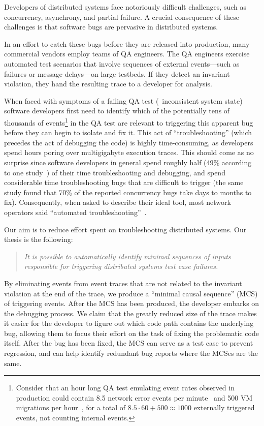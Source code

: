 Developers of distributed systems face notoriously difficult challenges, such as concurrency, asynchrony, and
partial failure. A crucial consequence of these challenges is that software
bugs are pervasive in distributed systems.

In an effort to catch these bugs
before they are released into production, many commercial vendors employ
teams of QA engineers. The QA engineers exercise automated test scenarios that involve
sequences of external events---such as failures or message delays---on large testbeds.
If they detect an invariant violation, they hand the resulting trace to a developer for analysis.

When faced with symptoms of a failing QA test (\eg~inconsistent system state)
software developers first need to identify which of the potentially tens of
thousands of events\footnote{Consider that an hour long QA test
emulating event rates observed in production could contain 8.5 network error
events per
minute~\cite{Greenberg:2009:VSF:1592568.1592576} and 500 VM migrations per
hour~\cite{Soundararajan:2010:CBS:1899928.1899941},
for a total of $8.5 \cdot 60 + 500 \approx 1000$ externally triggered events, not counting
internal events.} in the QA test are relevant to triggering
this apparent bug before they can begin to isolate and fix it.
This act of ``troubleshooting'' (which precedes the act of debugging the
code) is highly time-consuming, as developers spend hours poring
over multigigabyte execution traces. This should come as no surprise since software developers in general spend roughly half (49\% according to one
study~\cite{msoft_concurrency}) of their time troubleshooting and debugging, and spend
considerable time troubleshooting bugs that are difficult to trigger (the same study found
that 70\% of the reported concurrency bugs take days to months to fix).
Consequently, when asked to describe their
ideal tool, most network operators said ``automated
troubleshooting''~\cite{Zeng:Survey}.

Our aim is to reduce effort spent on troubleshooting distributed systems.
Our thesis is the following:
\begin{quote}
{\it
It is possible to
automatically identify minimal sequences of inputs
responsible for triggering
distributed systems test case failures.
}
\end{quote}
By eliminating events from event traces that are not related to the
invariant violation at the end of the trace, we produce a ``minimal
causal sequence'' (MCS) of triggering events. After the MCS has been produced, the developer embarks
on the debugging process. We claim that the greatly reduced size of the
trace makes it easier for the developer to figure out which code path contains
the underlying bug, allowing them to focus their effort on
the task of fixing the problematic code itself. After the bug has been fixed, the MCS
can serve as a test case to prevent regression,
and can help identify redundant bug reports where the MCSes are the same.

